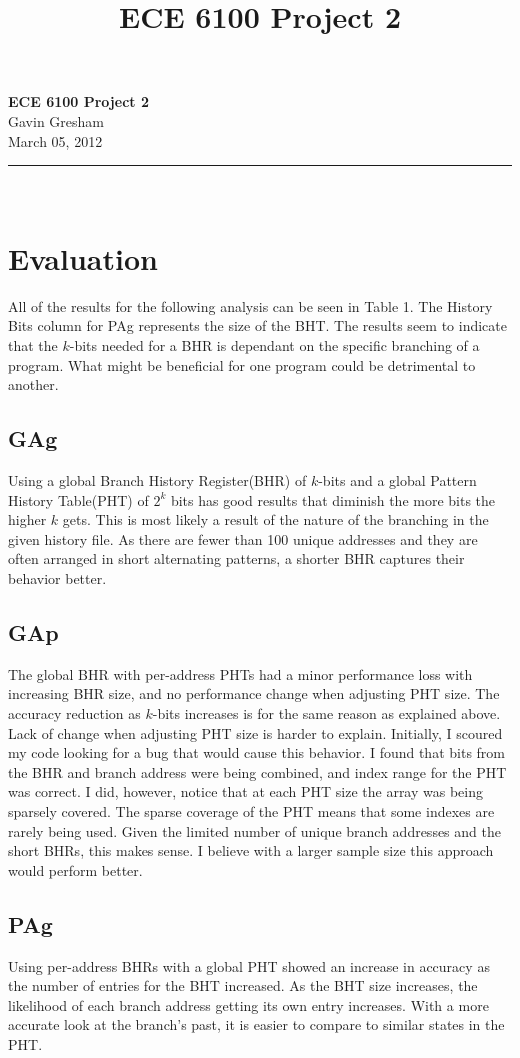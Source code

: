 \documentclass[letterpaper,11pt]{article}
\title{ECE 6100 Project 2}
\begin{document}
\begin{center}
\textbf{ECE 6100 Project 2}\\
Gavin Gresham\\
March 05, 2012\\
\rule{3in}{1pt}\\
\end{center}

\section{Evaluation}
All of the results for the following analysis can be seen in Table 1. The History Bits column for PAg represents the size of the BHT. The results seem to indicate that the $k$-bits needed for a BHR is dependant on the specific branching of a program. What might be beneficial for one program could be detrimental to another.
\subsection{GAg}
Using a global Branch History Register(BHR) of $k$-bits and a global Pattern History Table(PHT) of $2^k$ bits has good results that diminish the more bits the higher $k$ gets. This is most likely a result of the nature of the branching in the given history file. As there are fewer than 100 unique addresses and they are often arranged in short alternating patterns, a shorter BHR captures their behavior better.
\subsection{GAp}
The global BHR with per-address PHTs had a minor performance loss with increasing BHR size, and no performance change when adjusting PHT size. The accuracy reduction as $k$-bits increases is for the same reason as explained above. Lack of change when adjusting PHT size is harder to explain.
Initially, I scoured my code looking for a bug that would cause this behavior. I found that bits from the BHR and branch address were being combined, and index range for the PHT was correct. I did, however, notice that at each PHT size the array was being sparsely covered.
The sparse coverage of the PHT means that some indexes are rarely being used. Given the limited number of unique branch addresses and the short BHRs, this makes sense. I believe with a larger sample size this approach would perform better.
\subsection{PAg}
Using per-address BHRs with a global PHT showed an increase in accuracy as the number of entries for the BHT increased. As the BHT size increases, the likelihood of each branch address getting its own entry increases. With a more accurate look at the branch's past, it is easier to compare to similar states in the PHT.
\end{document}
